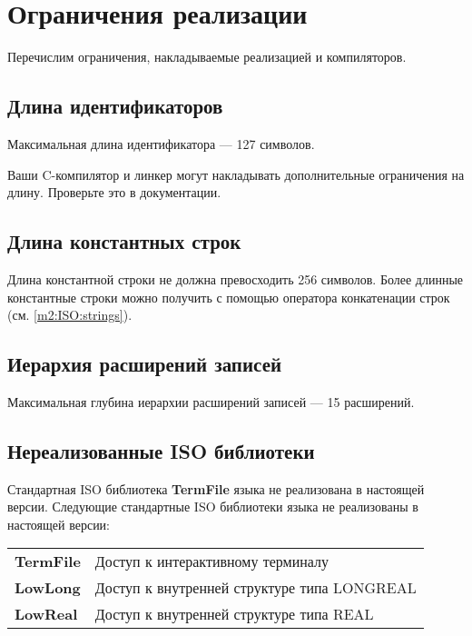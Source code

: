 \chapter{Ограничения реализации}\label{limits}

Перечислим ограничения, накладываемые реализацией 
\mt{} и \ot{} компиляторов.

\section*{Длина идентификаторов}

Максимальная длина идентификатора --- 127 символов.

\ifgenc
Ваши C-компилятор и линкер могут накладывать дополнительные ограничения
на длину. Проверьте это в документации.
\fi

\section*{Длина константных строк}

Длина константной строки не должна превосходить 256 символов.
Более длинные константные строки можно получить с помощью 
оператора конкатенации строк
(см. \ref{m2:ISO:strings}).

\section*{Иерархия расширений записей}

Максимальная глубина иерархии расширений записей --- 15 расширений.

\section*{Нереализованные ISO библиотеки}

\ifgencode
Стандартная ISO библиотека {\bf TermFile} языка \mt{} 
не реализована в настоящей версии.
\else
Следующие стандартные ISO библиотеки языка
 \mt{} не реализованы в настоящей версии:
\begin{flushleft}
\begin{tabular}{ll}
\bf TermFile & Доступ к интерактивному терминалу                  \\
\bf LowLong  & Доступ к внутренней структуре типа LONGREAL   \\
\bf LowReal  & Доступ к внутренней структуре типа     REAL   \\
\end{tabular}
\end{flushleft}
\fi

